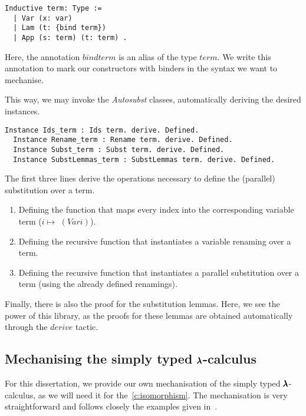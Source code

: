 \begin{lstlisting}[language=Coq]
  Inductive term: Type :=
  | Var (x: var)
  | Lam (t: {bind term})
  | App (s: term) (t: term) .
\end{lstlisting}

Here, the annotation \lst ${bind term}$ is an alias of the type \lst$term$.
We write this annotation to mark our constructors with binders in the syntax we want to mechanise.  

This way, we may invoke the \textit{Autosubst} classes, automatically deriving the desired instances.

\begin{lstlisting}[language=Coq]
  Instance Ids_term : Ids term. derive. Defined.
  Instance Rename_term : Rename term. derive. Defined.
  Instance Subst_term : Subst term. derive. Defined.
  Instance SubstLemmas_term : SubstLemmas term. derive. Defined.
\end{lstlisting}

The first three lines derive the operations necessary to define the (parallel) substitution over a term.
\begin{enumerate}
\item Defining the function that maps every index into the corresponding variable term ($i \mapsto $ \lst$(Var i)$).
\item Defining the recursive function that instantiates a variable renaming over a term.
\item Defining the recursive function that instantiates a parallel substitution over a term (using the already defined renamings).
\end{enumerate}

Finally, there is also the proof for the substitution lemmas.
Here, we see the power of this library, as the proofs for these lemmas are obtained automatically through the \lst$derive$ tactic. 


\subsection{Mechanising the simply typed $\pmb{\lambda}$-calculus}

For this dissertation, we provide our own mechanisation of the simply typed $\pmb{\lambda}$-calculus, as we will need it for the~\cref{c:isomorphism}.
The mechanisation is very straightforward and follows closely the examples given in~\cite{AutosubstManual,AutosubstSchafer}.

